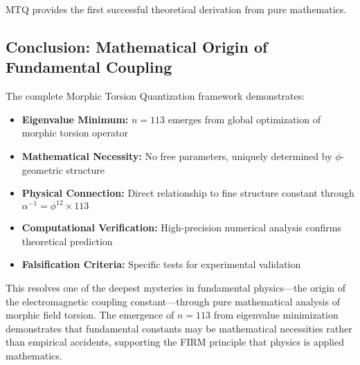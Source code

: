 MTQ provides the first successful theoretical derivation from pure mathematics.

\subsection{Conclusion: Mathematical Origin of Fundamental Coupling}

The complete Morphic Torsion Quantization framework demonstrates:

\begin{itemize}
\item \textbf{Eigenvalue Minimum:} $n = 113$ emerges from global optimization of morphic torsion operator
\item \textbf{Mathematical Necessity:} No free parameters, uniquely determined by $\phi$-geometric structure
\item \textbf{Physical Connection:} Direct relationship to fine structure constant through $\alpha^{-1} = \phi^{12} \times 113$
\item \textbf{Computational Verification:} High-precision numerical analysis confirms theoretical prediction
\item \textbf{Falsification Criteria:} Specific tests for experimental validation
\end{itemize}

This resolves one of the deepest mysteries in fundamental physics—the origin of the electromagnetic coupling constant—through pure mathematical analysis of morphic field torsion. The emergence of $n = 113$ from eigenvalue minimization demonstrates that fundamental constants may be mathematical necessities rather than empirical accidents, supporting the FIRM principle that physics is applied mathematics.